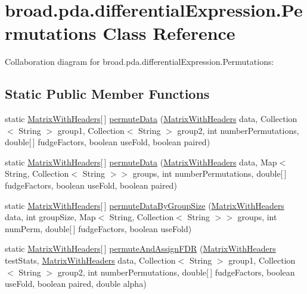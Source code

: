 \hypertarget{classbroad_1_1pda_1_1differential_expression_1_1_permutations}{\section{broad.\+pda.\+differential\+Expression.\+Permutations Class Reference}
\label{classbroad_1_1pda_1_1differential_expression_1_1_permutations}
}


Collaboration diagram for broad.\+pda.\+differential\+Expression.\+Permutations\+:
\subsection*{Static Public Member Functions}
\begin{DoxyCompactItemize}
\item 
static \hyperlink{classbroad_1_1core_1_1datastructures_1_1_matrix_with_headers}{Matrix\+With\+Headers}\mbox{[}$\,$\mbox{]} \hyperlink{classbroad_1_1pda_1_1differential_expression_1_1_permutations_ac99e261f56cb729d9208933d54b39a40}{permute\+Data} (\hyperlink{classbroad_1_1core_1_1datastructures_1_1_matrix_with_headers}{Matrix\+With\+Headers} data, Collection$<$ String $>$ group1, Collection$<$ String $>$ group2, int number\+Permutations, double\mbox{[}$\,$\mbox{]} fudge\+Factors, boolean use\+Fold, boolean paired)
\item 
static \hyperlink{classbroad_1_1core_1_1datastructures_1_1_matrix_with_headers}{Matrix\+With\+Headers}\mbox{[}$\,$\mbox{]} \hyperlink{classbroad_1_1pda_1_1differential_expression_1_1_permutations_a79850601ff62b23552cf42488a7b63ec}{permute\+Data} (\hyperlink{classbroad_1_1core_1_1datastructures_1_1_matrix_with_headers}{Matrix\+With\+Headers} data, Map$<$ String, Collection$<$ String $>$$>$ groups, int number\+Permutations, double\mbox{[}$\,$\mbox{]} fudge\+Factors, boolean use\+Fold, boolean paired)
\item 
static \hyperlink{classbroad_1_1core_1_1datastructures_1_1_matrix_with_headers}{Matrix\+With\+Headers}\mbox{[}$\,$\mbox{]} \hyperlink{classbroad_1_1pda_1_1differential_expression_1_1_permutations_a801a86043dd52b2e1f946f5b47ad964e}{permute\+Data\+By\+Group\+Size} (\hyperlink{classbroad_1_1core_1_1datastructures_1_1_matrix_with_headers}{Matrix\+With\+Headers} data, int group\+Size, Map$<$ String, Collection$<$ String $>$$>$ groups, int num\+Perm, double\mbox{[}$\,$\mbox{]} fudge\+Factors, boolean use\+Fold)
\item 
static \hyperlink{classbroad_1_1core_1_1datastructures_1_1_matrix_with_headers}{Matrix\+With\+Headers}\mbox{[}$\,$\mbox{]} \hyperlink{classbroad_1_1pda_1_1differential_expression_1_1_permutations_ad9e1986c26b196672579075bd1e3b53f}{permute\+And\+Assign\+F\+D\+R} (\hyperlink{classbroad_1_1core_1_1datastructures_1_1_matrix_with_headers}{Matrix\+With\+Headers} test\+Stats, \hyperlink{classbroad_1_1core_1_1datastructures_1_1_matrix_with_headers}{Matrix\+With\+Headers} data, Collection$<$ String $>$ group1, Collection$<$ String $>$ group2, int number\+Permutations, double\mbox{[}$\,$\mbox{]} fudge\+Factors, boolean use\+Fold, boolean paired, double alpha)
\end{DoxyCompactItemize}


